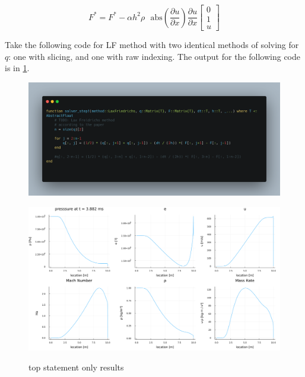 \documentclass{article}
\title{}
\author{Brooks Karlik}
\date{\today}
\newcommand{\pd}[2]{\frac{\partial #1}{\partial #2}}
\newcommand{\abs}{\text{abs}}
\begin{document}
\maketitle
\newpage


$$
	F^*
	= 
	F^* 
	- 
	\alpha h^2 \rho
	\text{ }
	\abs
	\left(
		\pd{u}{x}
	\right)
	\pd{u}{x}
	\begin{bmatrix}
		0 \\
		1 \\
		u
	\end{bmatrix}
$$


Take the following code for LF method with two identical methods of solving for $q$: one with slicing, and one with raw indexing.
The output for the following code is in \ref{top}.

\begin{figure}[H]
	\centering
	\includegraphics[width=\textwidth]{./figs/top.png}
\end{figure}

\begin{figure}[H]
	\centering
	\includegraphics[width=\textwidth]{./figs/top_statement.png}
	\label{top}
	\caption{top statement only results}
\end{figure}
\end{document}
